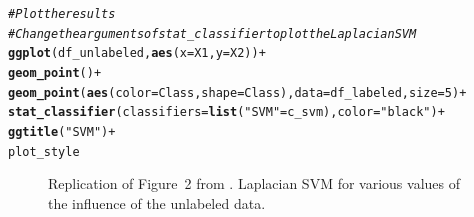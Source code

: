 \documentclass[runningheads,a4paper]{llncs}\usepackage[]{graphicx}\usepackage[]{color}
\makeatletter
\newcommand{\hlnum}[1]{\textcolor[rgb]{0.686,0.059,0.569}{#1}}%
\newcommand{\hlstr}[1]{\textcolor[rgb]{0.192,0.494,0.8}{#1}}%
\newcommand{\hlcom}[1]{\textcolor[rgb]{0.678,0.584,0.686}{\textit{#1}}}%
\newcommand{\hlopt}[1]{\textcolor[rgb]{0,0,0}{#1}}%
\newcommand{\hlstd}[1]{\textcolor[rgb]{0.345,0.345,0.345}{#1}}%
\newcommand{\hlkwc}[1]{\textcolor[rgb]{0.333,0.667,0.333}{#1}}%
\newcommand{\hlkwd}[1]{\textcolor[rgb]{0.737,0.353,0.396}{\textbf{#1}}}%
\newenvironment{kframe}{%
 \def\at@end@of@kframe{}%
 \ifinner\ifhmode%
  \def\at@end@of@kframe{\end{minipage}}%
  \begin{minipage}{\columnwidth}%
 \fi\fi%
 \def\FrameCommand##1{\hskip\@totalleftmargin \hskip-\fboxsep
 \colorbox{shadecolor}{##1}\hskip-\fboxsep
     \hskip-\linewidth \hskip-\@totalleftmargin \hskip\columnwidth}%
 \MakeFramed {\advance\hsize-\width
   \@totalleftmargin\z@ \linewidth\hsize
   \@setminipage}}%
 {\par\unskip\endMakeFramed%
 \at@end@of@kframe}
\newenvironment{knitrout}{}{} %
\makeatother
\begin{document}
\begin{knitrout}
\begin{kframe}
\begin{alltt}
\hlcom{# Plot the results }
\hlcom{# Change the arguments of stat_classifier to plot the Laplacian SVM}
\hlkwd{ggplot}\hlstd{(df_unlabeled,} \hlkwd{aes}\hlstd{(}\hlkwc{x}\hlstd{=X1,}\hlkwc{y}\hlstd{=X2))} \hlopt{+}
  \hlkwd{geom_point}\hlstd{()} \hlopt{+}
  \hlkwd{geom_point}\hlstd{(}\hlkwd{aes}\hlstd{(}\hlkwc{color}\hlstd{=Class,}\hlkwc{shape}\hlstd{=Class),}\hlkwc{data}\hlstd{=df_labeled,}\hlkwc{size}\hlstd{=}\hlnum{5}\hlstd{)} \hlopt{+}
  \hlkwd{stat_classifier}\hlstd{(}\hlkwc{classifiers}\hlstd{=}\hlkwd{list}\hlstd{(}\hlstr{"SVM"}\hlstd{=c_svm),}\hlkwc{color}\hlstd{=}\hlstr{"black"}\hlstd{)} \hlopt{+}
  \hlkwd{ggtitle}\hlstd{(}\hlstr{"SVM"}\hlstd{)}\hlopt{+}
  \hlstd{plot_style}
\end{alltt}
\end{kframe}\begin{figure}
\caption[Replication of Figure~2 from \cite{Belkin2006}]{Replication of Figure~2 from \cite{Belkin2006}. Laplacian SVM for various values of the influence of the unlabeled data.}\label{fig:manifoldregularization}
\end{figure}


\end{knitrout}
\end{document}
